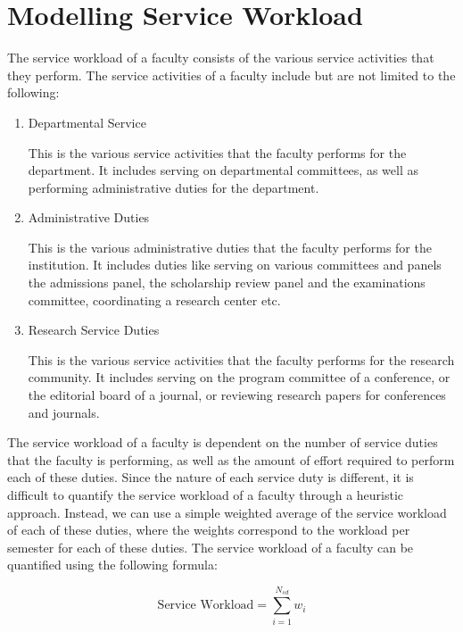 \section{Modelling Service Workload}

The service workload of a faculty consists of the various service activities that they perform. The service activities of a faculty include but are not limited to the following:

\begin{enumerate}

      \item Departmental Service

            This is the various service activities that the faculty performs for the department. It includes serving on departmental committees, as well as performing administrative duties for the department.

      \item Administrative Duties

            This is the various administrative duties that the faculty performs for the institution. It includes duties like serving on various committees and panels the admissions panel, the scholarship review panel and the examinations committee, coordinating a research center etc.

      \item Research Service Duties

            This is the various service activities that the faculty performs for the research community. It includes serving on the program committee of a conference, or the editorial board of a journal, or reviewing research papers for conferences and journals.

\end{enumerate}

The service workload of a faculty is dependent on the number of service duties that the faculty is performing, as well as the amount of effort required to perform each of these duties. Since the nature of each service duty is different, it is difficult to quantify the service workload of a faculty through a heuristic approach. Instead, we can use a simple weighted average of the service workload of each of these duties, where the weights correspond to the workload per semester for each of these duties. The service workload of a faculty can be quantified using the following formula:

\begin{equation*}
      \text{Service Workload} = \sum_{i=1}^{N_{sd}} w_i
\end{equation*}


